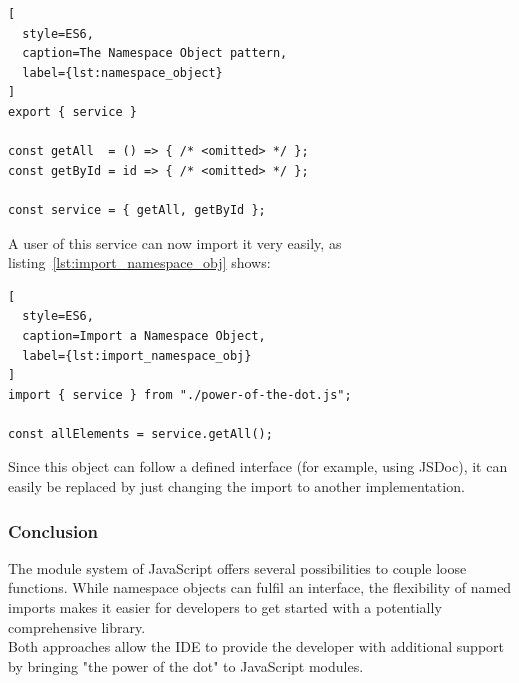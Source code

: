 \begin{lstlisting}[
  style=ES6,
  caption=The Namespace Object pattern,
  label={lst:namespace_object}
]
export { service }

const getAll  = () => { /* <omitted> */ };
const getById = id => { /* <omitted> */ };

const service = { getAll, getById };
\end{lstlisting}

A user of this service can now import it very easily, as
listing~\ref{lst:import_namespace_obj} shows:

\begin{lstlisting}[
  style=ES6,
  caption=Import a Namespace Object,
  label={lst:import_namespace_obj}
]
import { service } from "./power-of-the-dot.js";

const allElements = service.getAll();
\end{lstlisting}

Since this object can follow a defined interface (for example, using JSDoc), it
can easily be replaced by just changing the import to another implementation.

\subsubsection{Conclusion} %
\label{subsub:Power_of_the_dot_Conclusion}
The module system of JavaScript offers several possibilities to couple
loose functions. While namespace objects can fulfil an interface, the
flexibility of named imports makes it easier for developers to get started with
a potentially comprehensive library. \\ 
Both approaches allow the IDE to provide the developer with additional support by
bringing "the power of the dot" to JavaScript modules.

